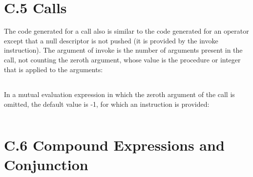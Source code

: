 \section[C.5 Calls]{C.5 Calls}

The code generated for a call also is similar to the code generated
for an operator except that a null descriptor is not pushed (it is
provided by the invoke instruction). The argument of invoke is the
number of arguments present in the call, not counting the zeroth
argument, whose value is the procedure or integer that is applied to
the arguments:

\begin{center}
\tablelasttail{\hline}
\begin{supertabular}{|m{1.9073598in}|m{2.75596in}|}

\end{supertabular}
\end{center}

In a mutual evaluation expression in which the zeroth argument of the
{\textquotedbl}call{\textquotedbl} is omitted, the default value is
-1, for which an instruction is provided:

\begin{center}
\tablelasttail{\hline}
\begin{supertabular}{|m{1.9073598in}|m{2.75596in}|}

\end{supertabular}
\end{center}


\section[C.6 Compound Expressions and Conjunction]{C.6 Compound Expressions and Conjunction}


